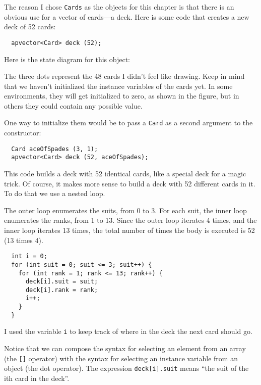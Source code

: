 The reason I chose {\tt Cards} as the objects for this chapter is that
there is an obvious use for a vector of cards---a deck.  Here is some
code that creates a new deck of 52 cards:

\begin{verbatim}
  apvector<Card> deck (52);
\end{verbatim}
%
Here is the state diagram for this object:


\vspace{0.1in}
\centerline{}
\vspace{0.1in}

The three dots represent the 48 cards I didn't feel like
drawing.  Keep in mind that we haven't initialized the instance
variables of the cards yet.  In some environments, they will get
initialized to zero, as shown in the figure, but in others they
could contain any possible value.

One way to initialize them would be to pass a {\tt Card} as
a second argument to the constructor:

\begin{verbatim}
  Card aceOfSpades (3, 1);
  apvector<Card> deck (52, aceOfSpades);
\end{verbatim}
%
This code builds a deck with 52 identical cards, like
a special deck for a magic trick.  Of course,
it makes more sense to build a deck with 52 different cards
in it.  To do that we use a nested loop.


The outer loop enumerates the suits, from 0 to 3.  For
each suit, the inner loop enumerates the ranks, from 1
to 13.  Since the outer loop iterates 4 times, and
the inner loop iterates 13 times, the total number of times
the body is executed is 52 (13 times 4).

\begin{verbatim}
  int i = 0;
  for (int suit = 0; suit <= 3; suit++) {
    for (int rank = 1; rank <= 13; rank++) {
      deck[i].suit = suit;
      deck[i].rank = rank;
      i++;
    }
  }
\end{verbatim}
%
I used the variable {\tt i} to keep track of where in the
deck the next card should go.


Notice that we can compose the syntax for selecting an element
from an array (the {\tt []} operator) with the syntax for
selecting an instance variable from an object (the dot
operator).  The expression {\tt deck[i].suit} means 
``the suit of the ith card in the deck''.

